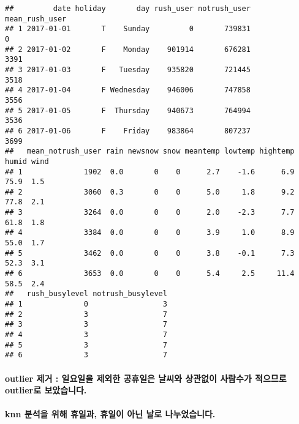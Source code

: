 \documentclass[]{article}
\newenvironment{Shaded}{\begin{snugshade}}{\end{snugshade}}
\newcommand{\KeywordTok}[1]{\textcolor[rgb]{0.13,0.29,0.53}{\textbf{#1}}}
\newcommand{\DecValTok}[1]{\textcolor[rgb]{0.00,0.00,0.81}{#1}}
\newcommand{\StringTok}[1]{\textcolor[rgb]{0.31,0.60,0.02}{#1}}
\newcommand{\OperatorTok}[1]{\textcolor[rgb]{0.81,0.36,0.00}{\textbf{#1}}}
\newcommand{\NormalTok}[1]{#1}
\let\oldparagraph\paragraph
\renewcommand{\paragraph}[1]{\oldparagraph{#1}\mbox{}}
\begin{document}
\begin{verbatim}
##         date holiday       day rush_user notrush_user mean_rush_user
## 1 2017-01-01       T    Sunday         0       739831              0
## 2 2017-01-02       F    Monday    901914       676281           3391
## 3 2017-01-03       F   Tuesday    935820       721445           3518
## 4 2017-01-04       F Wednesday    946006       747858           3556
## 5 2017-01-05       F  Thursday    940673       764994           3536
## 6 2017-01-06       F    Friday    983864       807237           3699
##   mean_notrush_user rain newsnow snow meantemp lowtemp hightemp humid wind
## 1              1902  0.0       0    0      2.7    -1.6      6.9  75.9  1.5
## 2              3060  0.3       0    0      5.0     1.8      9.2  77.8  2.1
## 3              3264  0.0       0    0      2.0    -2.3      7.7  61.8  1.8
## 4              3384  0.0       0    0      3.9     1.0      8.9  55.0  1.7
## 5              3462  0.0       0    0      3.8    -0.1      7.3  52.3  3.1
## 6              3653  0.0       0    0      5.4     2.5     11.4  58.5  2.4
##   rush_busylevel notrush_busylevel
## 1              0                 3
## 2              3                 7
## 3              3                 7
## 4              3                 7
## 5              3                 7
## 6              3                 7
\end{verbatim}

\paragraph{outlier 제거 : 일요일을 제외한 공휴일은 날씨와 상관없이
사람수가 적으므로 outlier로
보았습니다.}\label{outlier---------outlier-.}

\begin{Shaded}
\end{Shaded}

\paragraph{knn 분석을 위해 휴일과, 휴일이 아닌 날로
나누었습니다.}\label{knn-------.}
\end{document}
